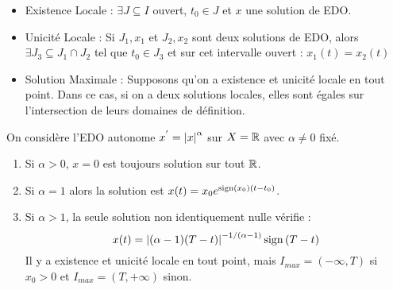 \documentclass{cours}
\begin{document}
\begin{definition}
    \begin{itemize}
        \item Existence Locale : $\exists J \subseteq I$ ouvert, $t_{0} \in J$ et $x$ une solution de EDO.
        \item Unicité Locale : Si $J_{1}, x_{1}$ et $J_{2}, x_{2}$ sont deux solutions de EDO, alors $\exists J_{3} \subseteq J_{1} \cap J_{2}$ tel que $t_{0} \in J_{3}$ et sur cet intervalle ouvert : $x_{1}(t) = x_{2}(t)$
        \item Solution Maximale : Supposons qu'on a existence et unicité locale en tout point. Dans ce cas, si on a deux solutions locales, elles sont égales sur l'intersection de leurs domaines de définition.
    \end{itemize}
\end{definition}

\begin{remark}
    On considère l'EDO autonome $x^{'} = \left|x\right|^{\alpha}$ sur $X = \mathbb{R}$ avec $\alpha \neq 0$ fixé.
    \begin{enumerate}
        \item Si $\alpha > 0$, $x = 0$ est toujours solution sur tout $\mathbb{R}$.
        \item Si $\alpha = 1$ alors la solution est $x(t) = x_{0}e^{\operatorname{sign}(x_{0})(t - t_{0})}$.
        \item Si $\alpha > 1$, la seule solution non identiquement nulle vérifie :
              \[
                  x(t) = \left|(\alpha - 1)(T - t)\right|^{- 1 / (\alpha - 1)}\operatorname{sign}{(T-t)}
              \]
              Il y a existence et unicité locale en tout point, mais $I_{max} = \left(-\infty, T\right)$ si $x_{0}  > 0$ et $I_{max} = \left(T, +\infty\right)$ sinon.
    \end{enumerate}
\end{remark}
\end{document}
